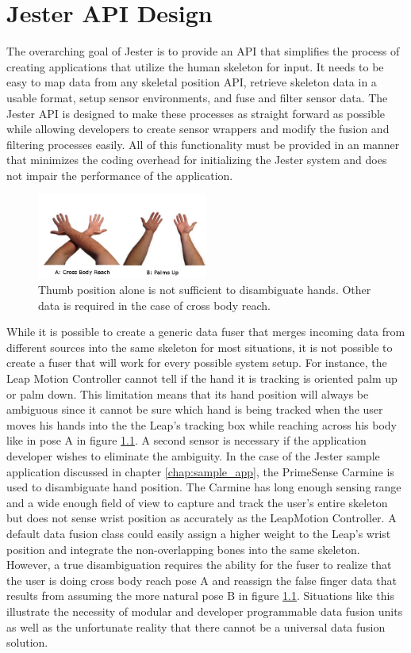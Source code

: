 \chapter{Jester API Design}\label{chap:api_des}

The overarching goal of Jester is to provide an API that simplifies the process of creating applications that utilize the human skeleton for input. It needs to be easy to map data from any skeletal position API, retrieve skeleton data in a usable format, setup sensor environments, and fuse and filter sensor data. The Jester API is designed to make these processes as straight forward as possible while allowing developers to create sensor wrappers and modify the fusion and filtering processes easily. All of this functionality must be provided in an manner that minimizes the coding overhead for initializing the Jester system and does not impair the performance of the application.

\begin{figure}[]
\centering
\includegraphics[width=0.5\textwidth]{figures/handAmbig}
\caption{Thumb position alone is not sufficient to disambiguate hands. Other data is required in the case of cross body reach.}
\label{fig:hand_cross}
\end{figure}

While it is possible to create a generic data fuser that merges incoming data from different sources into the same skeleton for most situations, it is not possible to create a fuser that will work for every possible system setup. For instance, the Leap Motion Controller cannot tell if the hand it is tracking is oriented palm up or palm down. This limitation means that its hand position will always be ambiguous since it cannot be sure which hand is being tracked when the user moves his hands into the the Leap’s tracking box while reaching across his body like in pose A in figure \ref{fig:hand_cross}. A second sensor is necessary if the application developer wishes to eliminate the ambiguity. In the case of the Jester sample application discussed in chapter \ref{chap:sample_app}, the PrimeSense Carmine is used to disambiguate hand position. The Carmine has long enough sensing range and a wide enough field of view to capture and track the user’s entire skeleton but does not sense wrist position as accurately as the LeapMotion Controller. A default data fusion class could easily assign a higher weight to the Leap’s wrist position and integrate the non-overlapping bones into the same skeleton. However, a true disambiguation requires the ability for the fuser to realize that the user is doing cross body reach pose A and reassign the false finger data that results from assuming the more natural pose B in figure \ref{fig:hand_cross}. Situations like this illustrate the necessity of modular and developer programmable data fusion units as well as the unfortunate reality that there cannot be a universal data fusion solution.

